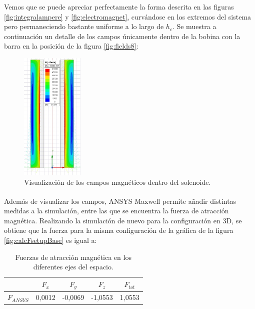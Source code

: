 Vemos que se puede apreciar perfectamente la forma descrita en las figuras \ref{fig:integralampere} y \ref{fig:electromagnet}, curvándose en los extremos del sistema pero permaneciendo bastante uniforme a lo largo de \(h_c\). Se muestra a continuación un detalle de los campos únicamente dentro de la bobina con la barra en la posición de la figura \ref{fig:fields8}:

\begin{figure}[H]
    \centering
    \includegraphics[width=3cm]{FigurasMemoria/fieldsDetail.jpg}
    \caption{Visualización de los campos magnéticos dentro del solenoide.}
    \label{fig:fieldsDetail} %
\end{figure}

Además de visualizar los campos, ANSYS Maxwell\textsuperscript{\textregistered} permite añadir distintas medidas a la simulación, entre las que se encuentra la fuerza de atracción magnética. Realizando la simulación de nuevo para la configuración en 3D, se obtiene que la fuerza para la misma configuración de la gráfica de la figura \ref{fig:calcFsetupBase} es igual a:

\begin{table}[h]
    \centering
    \begin{tabular}{|c|c|c|c|c|}
        \hline
        & \(F_x\) & \(F_y\) & \(F_z\) & \(F_{tot}\) \\
        \hline
        \(F_{ANSYS}\) & 0,0012 & -0,0069 & -1,0553 & 1,0553 \\
        \hline
    \end{tabular}
    \caption{Fuerzas de atracción magnética en los diferentes ejes del espacio.}
    \label{tab:fuerzas}
\end{table}


